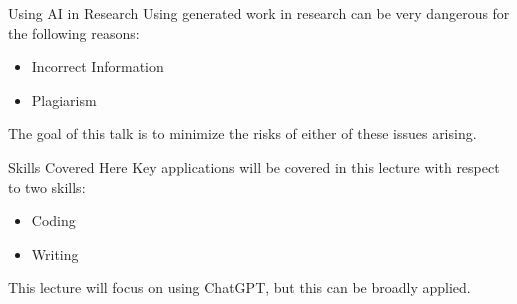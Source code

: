 \documentclass[aspectratio=43]{beamer}
\begin{document}
\begin{frame}{Using AI in Research}
    Using generated work in research can be very dangerous for the following reasons:
    \begin{itemize}
        \item Incorrect Information
        \item Plagiarism
    \end{itemize}
    The goal of this talk is to minimize the risks of either of these issues arising. 
\end{frame}
\begin{frame}{Skills Covered Here}
    Key applications will be covered in this lecture with respect to two skills:
    \begin{itemize}
        \item Coding
        \item Writing
    \end{itemize}
    This lecture will focus on using ChatGPT, but this can be broadly applied.
\end{frame}
\end{document}
